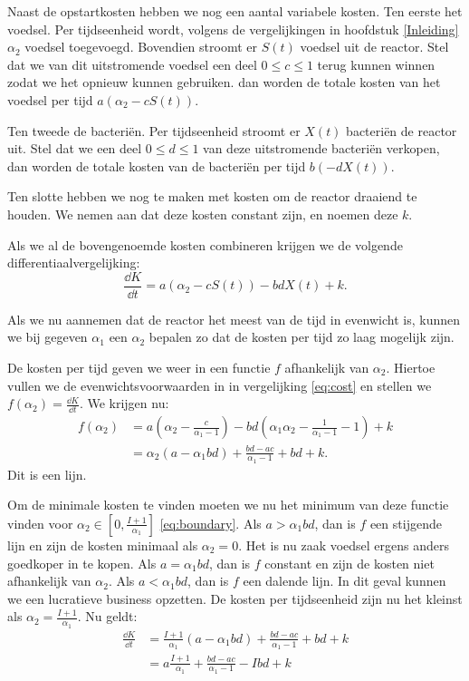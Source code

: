 Naast de opstartkosten hebben we nog een aantal variabele kosten. Ten eerste het voedsel. Per tijdseenheid wordt, volgens de vergelijkingen in hoofdstuk \ref{Inleiding} $\alpha_2$ voedsel toegevoegd. Bovendien stroomt er $S(t)$ voedsel uit de reactor. Stel dat we van dit uitstromende voedsel een deel $0\leq c\leq1$ terug kunnen winnen zodat we het opnieuw kunnen gebruiken. dan worden de totale kosten van het voedsel per tijd $a(\alpha_2-cS(t))$. 

Ten tweede de bacteri\"en. Per tijdseenheid stroomt er $X(t)$ bacteri\"en de reactor uit. Stel dat we een deel $0\leq d\leq1$ van deze uitstromende bacteri\"en verkopen, dan worden de totale kosten van de bacteri\"en per tijd $b(-dX(t))$.

Ten slotte hebben we nog te maken met kosten om de reactor draaiend te houden. We nemen aan dat deze kosten constant zijn, en noemen deze $k$.

Als we al de bovengenoemde kosten combineren krijgen we de volgende differentiaalvergelijking:
\begin{equation}
\frac{\dd K}{\dd t} = a(\alpha_2 - cS(t)) - bdX(t) + k. \label{eq:cost}
\end{equation}

Als we nu aannemen dat de reactor het meest van de tijd in evenwicht is, kunnen we bij gegeven $\alpha_1$ een $\alpha_2$ bepalen zo dat de kosten per tijd zo laag mogelijk zijn.

De kosten per tijd geven we weer in een functie $f$ afhankelijk van $\alpha_2$. Hiertoe vullen we de evenwichtsvoorwaarden in in vergelijking \ref{eq:cost} en stellen we $f(\alpha_2) = \frac{\dd K}{\dd t}$. We krijgen nu:
\begin{align*}
f(\alpha_2)
&=a(\alpha_2 - \frac{c}{\alpha_1-1}) - bd(\alpha_1\alpha_2-\frac{1}{\alpha_1-1}-1) + k\\
&=\alpha_2(a-\alpha_1bd) + \frac{bd-ac}{\alpha_1-1}+bd+k.
\end{align*}
Dit is een lijn.

Om de minimale kosten te vinden moeten we nu het minimum van deze functie vinden voor $\alpha_2\in[0, \frac{I + 1}{\alpha_1}]$ \ref{eq:boundary}. Als $a > \alpha_1bd$, dan is $f$ een stijgende lijn en zijn de kosten minimaal als $\alpha_2 = 0$. Het is nu zaak voedsel ergens anders goedkoper in te kopen. Als $a = \alpha_1bd$, dan is $f$ constant en zijn de kosten niet afhankelijk van $\alpha_2$. Als $a < \alpha_1bd$, dan is $f$ een dalende lijn. In dit geval kunnen we een lucratieve business opzetten. De kosten per tijdseenheid zijn nu het kleinst als $\alpha_2 = \frac{I+1}{\alpha_1}$. Nu geldt:
\begin{align*}
\frac{\dd K}{\dd t}
&=\frac{I+1}{\alpha_1}(a-\alpha_1bd) + \frac{bd-ac}{\alpha_1-1}+bd+k\\
&=a\frac{I+1}{\alpha_1} + \frac{bd-ac}{\alpha_1-1} - Ibd + k
\end{align*}

